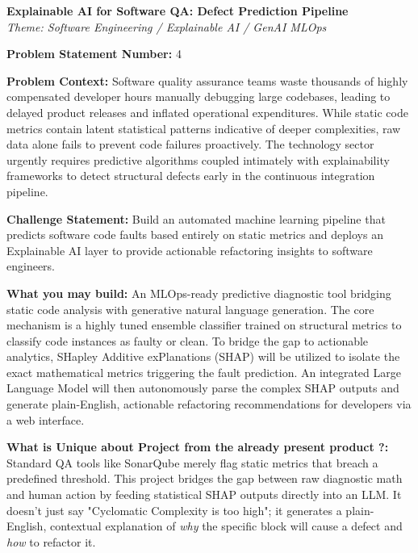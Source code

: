 \documentclass[11pt, a4paper]{article}
\begin{document}
\begin{center}
    \Large\textbf{Explainable AI for Software QA: Defect Prediction Pipeline} \\
    \normalsize\textit{Theme: Software Engineering / Explainable AI / GenAI MLOps}
\end{center}
\vspace{0.8cm}

\noindent\textbf{Problem Statement Number:} 4

\vspace{0.4cm}
\noindent\textbf{Problem Context:} Software quality assurance teams waste thousands of highly compensated developer hours manually debugging large codebases, leading to delayed product releases and inflated operational expenditures. While static code metrics contain latent statistical patterns indicative of deeper complexities, raw data alone fails to prevent code failures proactively. The technology sector urgently requires predictive algorithms coupled intimately with explainability frameworks to detect structural defects early in the continuous integration pipeline.

\vspace{0.4cm}
\noindent\textbf{Challenge Statement:} Build an automated machine learning pipeline that predicts software code faults based entirely on static metrics and deploys an Explainable AI layer to provide actionable refactoring insights to software engineers.

\vspace{0.4cm}
\noindent\textbf{What you may build:} An MLOps-ready predictive diagnostic tool bridging static code analysis with generative natural language generation. The core mechanism is a highly tuned ensemble classifier trained on structural metrics to classify code instances as faulty or clean. To bridge the gap to actionable analytics, SHapley Additive exPlanations (SHAP) will be utilized to isolate the exact mathematical metrics triggering the fault prediction. An integrated Large Language Model will then autonomously parse the complex SHAP outputs and generate plain-English, actionable refactoring recommendations for developers via a web interface.

\vspace{0.4cm}
\noindent\textbf{What is Unique about Project from the already present product ?:} Standard QA tools like SonarQube merely flag static metrics that breach a predefined threshold. This project bridges the gap between raw diagnostic math and human action by feeding statistical SHAP outputs directly into an LLM. It doesn't just say "Cyclomatic Complexity is too high"; it generates a plain-English, contextual explanation of \textit{why} the specific block will cause a defect and \textit{how} to refactor it.
\end{document}
